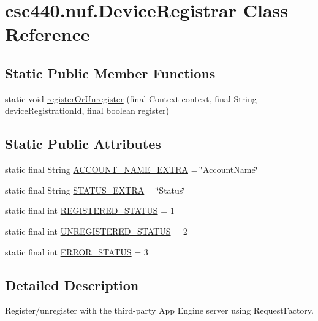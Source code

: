 \hypertarget{classcsc440_1_1nuf_1_1_device_registrar}{\section{csc440.\-nuf.\-Device\-Registrar Class Reference}
\label{classcsc440_1_1nuf_1_1_device_registrar}
}
\subsection*{Static Public Member Functions}
\begin{DoxyCompactItemize}
\item 
static void \hyperlink{classcsc440_1_1nuf_1_1_device_registrar_a588aba958edca877d7f3f995d8854dbd}{register\-Or\-Unregister} (final Context context, final String device\-Registration\-Id, final boolean register)
\end{DoxyCompactItemize}
\subsection*{Static Public Attributes}
\begin{DoxyCompactItemize}
\item 
static final String \hyperlink{classcsc440_1_1nuf_1_1_device_registrar_adc5815321a10b8875ec81ede0da62c43}{A\-C\-C\-O\-U\-N\-T\-\_\-\-N\-A\-M\-E\-\_\-\-E\-X\-T\-R\-A} = \char`\"{}Account\-Name\char`\"{}
\item 
static final String \hyperlink{classcsc440_1_1nuf_1_1_device_registrar_aaf88ac176dfd4264b4138fc00b49998a}{S\-T\-A\-T\-U\-S\-\_\-\-E\-X\-T\-R\-A} = \char`\"{}Status\char`\"{}
\item 
static final int \hyperlink{classcsc440_1_1nuf_1_1_device_registrar_a4a59981b92ee9c8476393b73560b3d48}{R\-E\-G\-I\-S\-T\-E\-R\-E\-D\-\_\-\-S\-T\-A\-T\-U\-S} = 1
\item 
static final int \hyperlink{classcsc440_1_1nuf_1_1_device_registrar_a9a90ee9e8e64edc961b0e3c3b454d047}{U\-N\-R\-E\-G\-I\-S\-T\-E\-R\-E\-D\-\_\-\-S\-T\-A\-T\-U\-S} = 2
\item 
static final int \hyperlink{classcsc440_1_1nuf_1_1_device_registrar_abf61261a85f1e4912a777059da4bb994}{E\-R\-R\-O\-R\-\_\-\-S\-T\-A\-T\-U\-S} = 3
\end{DoxyCompactItemize}


\subsection{Detailed Description}
Register/unregister with the third-\/party App Engine server using Request\-Factory. 

